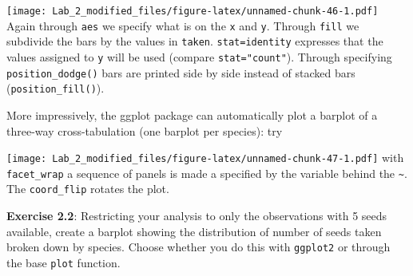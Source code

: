 \documentclass[11pt,]{article}
\newenvironment{Shaded}{\begin{snugshade}}{\end{snugshade}}
\newcommand{\KeywordTok}[1]{\textcolor[rgb]{0.13,0.29,0.53}{\textbf{#1}}}
\newcommand{\DataTypeTok}[1]{\textcolor[rgb]{0.13,0.29,0.53}{#1}}
\newcommand{\DecValTok}[1]{\textcolor[rgb]{0.00,0.00,0.81}{#1}}
\newcommand{\StringTok}[1]{\textcolor[rgb]{0.31,0.60,0.02}{#1}}
\newcommand{\OperatorTok}[1]{\textcolor[rgb]{0.81,0.36,0.00}{\textbf{#1}}}
\newcommand{\NormalTok}[1]{#1}
\begin{document}
\texttt{[image: Lab\_2\_modified\_files/figure-latex/unnamed-chunk-46-1.pdf]}
Again through \texttt{aes} we specify what is on the \texttt{x} and
\texttt{y}. Through \texttt{fill} we subdivide the bars by the values in
\texttt{taken}. \texttt{stat=identity} expresses that the values
assigned to \texttt{y} will be used (compare \texttt{stat="count"}).
Through specifying \texttt{position\_dodge()} bars are printed side by
side instead of stacked bars (\texttt{position\_fill()}).

More impressively, the ggplot package can automatically plot a barplot
of a three-way cross-tabulation (one barplot per species): try

\begin{Shaded}
\end{Shaded}

\texttt{[image: Lab\_2\_modified\_files/figure-latex/unnamed-chunk-47-1.pdf]}
with \texttt{facet\_wrap} a sequence of panels is made a specified by
the variable behind the \texttt{\textasciitilde{}}. The
\texttt{coord\_flip} rotates the plot.

\textbf{Exercise 2.2}: Restricting your analysis to only the
observations with 5 seeds available, create a barplot showing the
distribution of number of seeds taken broken down by species. Choose
whether you do this with \texttt{ggplot2} or through the base
\texttt{plot} function.
\end{document}
